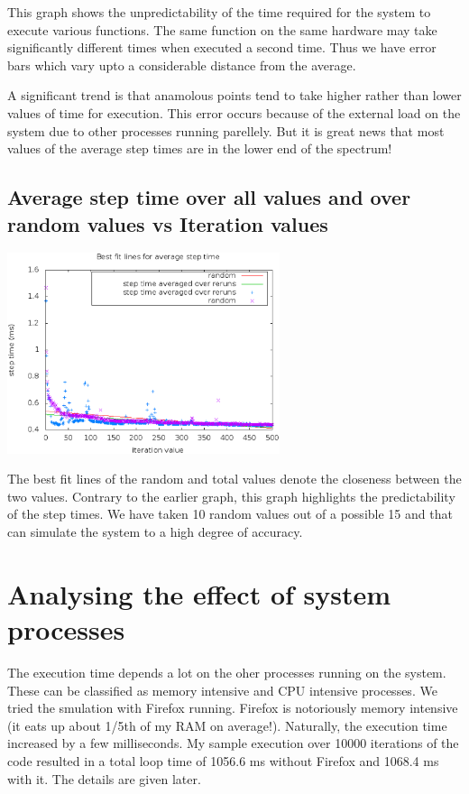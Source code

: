 \documentclass[a4paper,11pt]{article}
\begin{document}
This graph shows the unpredictability of the time required for the system to execute various functions. The same function on the same hardware may take significantly different times when executed a second time. Thus we have error bars which vary upto a considerable distance from the average.

A significant trend is that anamolous points tend to take higher rather than lower values of time for execution. This error occurs because of the external load on the system due to other processes running parellely. But it is great news that most values of the average step times are in the lower end of the spectrum!

\subsection{Average step time over all values and over random values vs Iteration values}

\begin{center}
\includegraphics[width=0.6\textwidth]{plots/g05_plot05.eps} 
\end{center}

The best fit lines of the random and total values denote the closeness between the two values. Contrary to the earlier graph, this graph highlights the predictability of the step times. We have taken 10 random values out of a possible 15 and that can simulate the system to a high degree of accuracy.

\section{Analysing the effect of system processes}

The execution time depends a lot on the oher processes running on the system. These can be classified as memory intensive and CPU intensive processes. We tried the smulation with Firefox running. Firefox is notoriously memory intensive (it eats up about 1/5th of my RAM on average!). Naturally, the execution time increased by a few milliseconds. 
My sample execution over 10000 iterations of the code resulted in a total loop time of 1056.6 ms without Firefox and 1068.4 ms with it. The details are given later.
\end{document}
